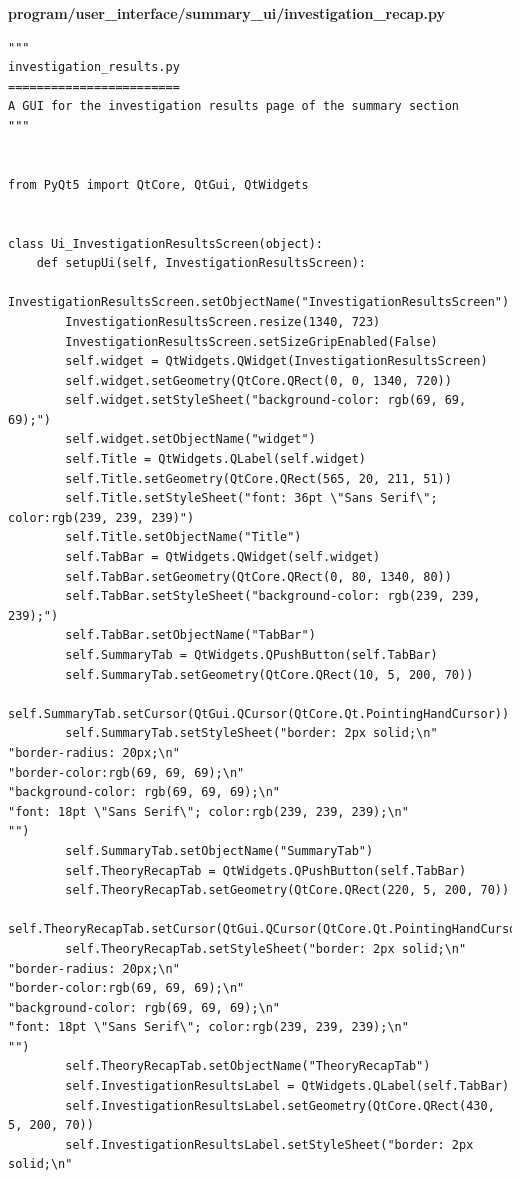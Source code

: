 \documentclass[12pt]{article}
\begin{document}
\textbf{program/user\_interface/summary\_ui/investigation\_recap.py}
\begin{lstlisting}
"""
investigation_results.py
========================
A GUI for the investigation results page of the summary section
"""


from PyQt5 import QtCore, QtGui, QtWidgets


class Ui_InvestigationResultsScreen(object):
    def setupUi(self, InvestigationResultsScreen):
        InvestigationResultsScreen.setObjectName("InvestigationResultsScreen")
        InvestigationResultsScreen.resize(1340, 723)
        InvestigationResultsScreen.setSizeGripEnabled(False)
        self.widget = QtWidgets.QWidget(InvestigationResultsScreen)
        self.widget.setGeometry(QtCore.QRect(0, 0, 1340, 720))
        self.widget.setStyleSheet("background-color: rgb(69, 69, 69);")
        self.widget.setObjectName("widget")
        self.Title = QtWidgets.QLabel(self.widget)
        self.Title.setGeometry(QtCore.QRect(565, 20, 211, 51))
        self.Title.setStyleSheet("font: 36pt \"Sans Serif\"; color:rgb(239, 239, 239)")
        self.Title.setObjectName("Title")
        self.TabBar = QtWidgets.QWidget(self.widget)
        self.TabBar.setGeometry(QtCore.QRect(0, 80, 1340, 80))
        self.TabBar.setStyleSheet("background-color: rgb(239, 239, 239);")
        self.TabBar.setObjectName("TabBar")
        self.SummaryTab = QtWidgets.QPushButton(self.TabBar)
        self.SummaryTab.setGeometry(QtCore.QRect(10, 5, 200, 70))
        self.SummaryTab.setCursor(QtGui.QCursor(QtCore.Qt.PointingHandCursor))
        self.SummaryTab.setStyleSheet("border: 2px solid;\n"
"border-radius: 20px;\n"
"border-color:rgb(69, 69, 69);\n"
"background-color: rgb(69, 69, 69);\n"
"font: 18pt \"Sans Serif\"; color:rgb(239, 239, 239);\n"
"")
        self.SummaryTab.setObjectName("SummaryTab")
        self.TheoryRecapTab = QtWidgets.QPushButton(self.TabBar)
        self.TheoryRecapTab.setGeometry(QtCore.QRect(220, 5, 200, 70))
        self.TheoryRecapTab.setCursor(QtGui.QCursor(QtCore.Qt.PointingHandCursor))
        self.TheoryRecapTab.setStyleSheet("border: 2px solid;\n"
"border-radius: 20px;\n"
"border-color:rgb(69, 69, 69);\n"
"background-color: rgb(69, 69, 69);\n"
"font: 18pt \"Sans Serif\"; color:rgb(239, 239, 239);\n"
"")
        self.TheoryRecapTab.setObjectName("TheoryRecapTab")
        self.InvestigationResultsLabel = QtWidgets.QLabel(self.TabBar)
        self.InvestigationResultsLabel.setGeometry(QtCore.QRect(430, 5, 200, 70))
        self.InvestigationResultsLabel.setStyleSheet("border: 2px solid;\n"

\end{lstlisting}
\end{document}
